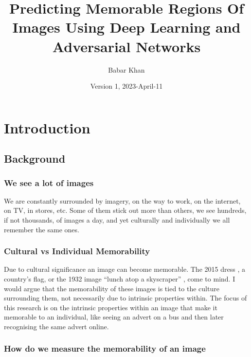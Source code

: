 \documentclass{UoYCSproject}
\author{Babar Khan}
\title{Predicting Memorable Regions Of Images Using Deep Learning and Adversarial Networks}
\date{Version 1, 2023-April-11}
\begin{document}
\maketitle

\newpage{}

\tableofcontents

\newpage{}

\chapter{Introduction}


\section{Background}

\subsection{We see a lot of images}

We are constantly surrounded by imagery, on the way to work, on the internet, on TV, in stores, etc. Some of them stick out more than others, we see hundreds, if not thousands, of images a day, and yet culturally and individually we all remember the same ones.

\subsection{Cultural vs Individual Memorability}

Due to cultural significance an image can become memorable. The 2015 dress \cite{BBCDress2015}, a country's flag, or the 1932 image “lunch atop a skyscraper” \cite{gambino_2012}, come to mind. I would argue that the memorability of these images is tied to the culture surrounding them, not necessarily due to intrinsic properties within. The focus of this research is on the intrinsic properties within an image that make it memorable to an individual, like seeing an advert on a bus and then later recognising the same advert online.

\subsection{How do we measure the memorability of an image}

\end{document}
